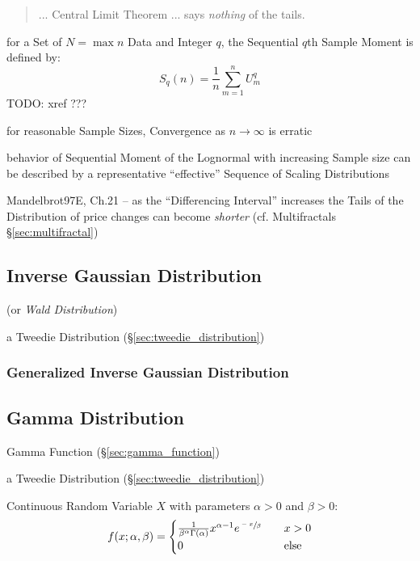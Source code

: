 \begin{quote}
  ... Central Limit Theorem ... says \emph{nothing} of the tails.
\end{quote}

for a Set of $N = \max n$ Data and Integer $q$, the Sequential $q$th Sample
Moment is defined by:
\[
  S_q(n) = \frac{1}{n} \sum_{m = 1}^n U_m^q
\]
TODO: xref ???

for reasonable Sample Sizes, Convergence as $n \to \infty$ is erratic

behavior of Sequential Moment of the Lognormal with increasing Sample size can
be described by a representative ``effective'' Sequence of Scaling Distributions

Mandelbrot97E, Ch.21 -- as the ``Differencing Interval'' increases the Tails of
the Distribution of price changes can become \emph{shorter} (cf. Multifractals
\S\ref{sec:multifractal})



\subsection{Inverse Gaussian Distribution}\label{sec:inverse_gaussian}

(or \emph{Wald Distribution})

a Tweedie Distribution (\S\ref{sec:tweedie_distribution})



\subsubsection{Generalized Inverse Gaussian Distribution}
\label{sec:generalized_inverse_gaussian}



\subsection{Gamma Distribution}\label{sec:gamma_distribution}

Gamma Function (\S\ref{sec:gamma_function})

a Tweedie Distribution (\S\ref{sec:tweedie_distribution})

Continuous Random Variable $X$ with parameters $\alpha > 0$ and
$\beta > 0$:
\[
  f(x; \alpha, \beta) =
  \begin{cases}
    \frac{1}{\beta^\alpha \Gamma(\alpha)} x^{\alpha-1} e^{\sfrac{-x}{\beta}}
      & \quad x > 0 \\
    0 & \quad\text{else} \\
  \end{cases}
\]

